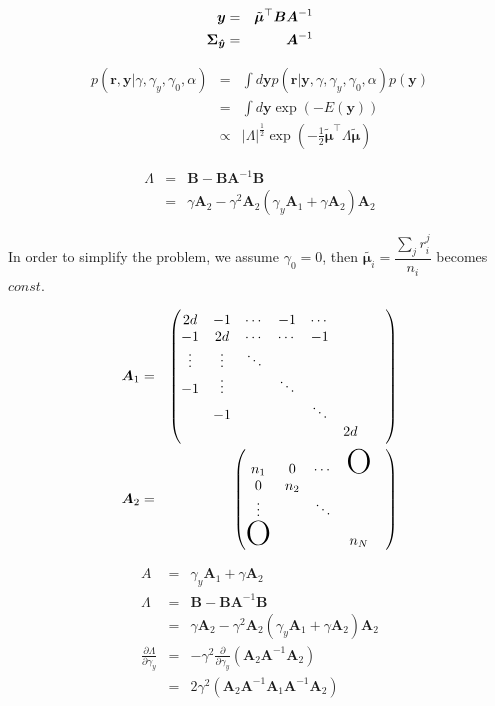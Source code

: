 \documentclass[platex, a4paper]{jsarticle}
\begin{document}
\begin{eqnarray}
  \bm{y} &=& \tilde{\bm{\mu}}^{\top}\bm{B} \bm{A}^{-1} \\
  \bm{\Sigma_{\hat{y}}} &=& \bm{A}^{-1}
\end{eqnarray}

\begin{eqnarray}
  p( \bm{r}, \bm{y} | \gamma, \gamma_y, \gamma_0, \alpha)
    &=& \int d\bm{y}  p( \bm{r}|\bm{y}, \gamma, \gamma_y, \gamma_0, \alpha ) p(\bm{y} ) \\
    &=&  \int d\bm{y}  \exp\left(- E(\bm{y} ) \right) \\
    &\propto& |\Lambda|^{\frac{1}{2}}  \exp\left( - \frac{1}{2} \tilde{\bm{\mu}}^\top \Lambda \tilde{\bm{\mu}}\right)
\end{eqnarray}

\begin{eqnarray}
  \Lambda &=& \bm{B} - \bm{B} \bm{A}^{-1} \bm{B}\\
           &=& \gamma \bm{A}_2 - \gamma^2 \bm{A}_2 (\gamma_y \bm{A}_1 + \gamma \bm{A}_2) \bm{A}_2
\end{eqnarray}

In order to simplify the problem,
we assume $\gamma_0=0$, then $\tilde{\bm{\mu}_i} = \dfrac {\sum _{j}r_{i}^{j}} {n_{i}}$ becomes $const$.

\begin{eqnarray}
  \bm{A}_1 &=&
    \begin{pmatrix}
      2d & -1 & \cdots & -1 & \cdots &\\
      -1 & 2d &\cdots &  \cdots &  -1  &  \\
      \vdots&\vdots& \ddots &&& \\
      -1 &\vdots&& \ddots &&& \\
      & -1 &&& \ddots &&& \\
      &&&&& 2d \\
    \end{pmatrix} \\
  \bm{A}_2  &=&
    \begin{pmatrix}
      n_1 & 0 & \cdots & \mbox{\Huge O}\\
      0 & n_2 & && \\
      \vdots & & \ddots \\
      \mbox{\Huge O}&&& n_N
    \end{pmatrix}
\end{eqnarray}

\begin{eqnarray}
  A &=& \gamma_y \bm{A}_1 + \gamma \bm{A}_2 \\
  \Lambda &=& \bm{B} - \bm{B} \bm{A}^{-1} \bm{B}\\
           &=& \gamma \bm{A}_2 - \gamma^2 \bm{A}_2 (\gamma_y \bm{A}_1 + \gamma \bm{A}_2) \bm{A}_2 \\
  \frac{\partial \Lambda}{\partial \gamma_y} &=& - \gamma^2 \frac{\partial}{\partial \gamma_y}
    \left(\bm{A}_2 \bm{A}^{-1} \bm{A}_2  \right) \\
    &=& 2 \gamma^2  \left(\bm{A}_2 \bm{A}^{-1} \bm{A}_1 \bm{A}^{-1} \bm{A}_2  \right)
\end{eqnarray}
\end{document}
